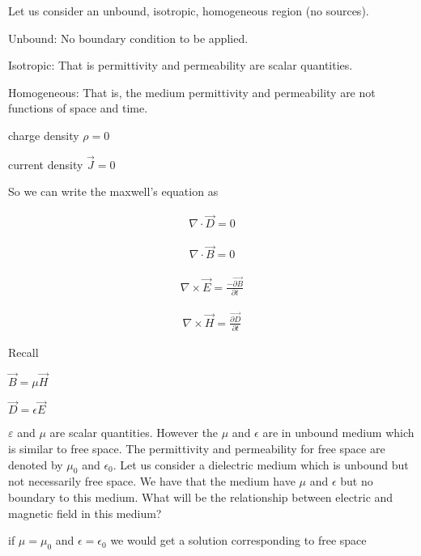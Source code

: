 		Let us consider an unbound, isotropic, homogeneous region (no sources).
		
		Unbound: No boundary condition to be applied.
		
		Isotropic: That is permittivity and permeability are scalar quantities.
		
		Homogeneous: That is, the medium permittivity and permeability are not functions of space and time.
		
		\bigskip
		
		\bigskip
		
		charge density $\rho=0$
		
		current density $\vec{J}=0$
		
		\bigskip
		
		
		So we can write the maxwell's equation as
		
		\bigskip
		\begin{align}
		\nabla\cdot\vec{D}=0
		\end{align}
		
		
		\bigskip
		\begin{align}
			\nabla\cdot\vec{B}=0
		\end{align}
		
		
		\bigskip
		\begin{align}
		\nabla\times\vec{E}=\frac{-\vec{\partial B}}{\partial t}
		\end{align}
		
		
		\bigskip
		\begin{align}
		\nabla\times\vec{H}=\frac{\vec{\partial D}}{\partial t}
		\end{align}
		
		
		\bigskip
		Recall 
		
		$\vec{B}=\mu\vec{H}$
		
		$\vec{D}=\epsilon\vec{E}$
		
		\bigskip
		
		$\varepsilon$ and $\mu$ are scalar quantities. However the $\mu$ and $\epsilon$ are in unbound medium which is similar to free space. The permittivity and permeability for free space are denoted by $\mu_{0}$ and $\epsilon_{0}$. Let us consider a dielectric medium which is unbound but not necessarily free space. We have that the medium have  $\mu$ and $\epsilon$ but no boundary to this medium. What will be the relationship between electric and magnetic field in this medium? 
		
		
		\bigskip
		
		if $\mu=\mu_{0}$ and $\epsilon=\epsilon_{0}$ we would get a solution corresponding to free space
		

